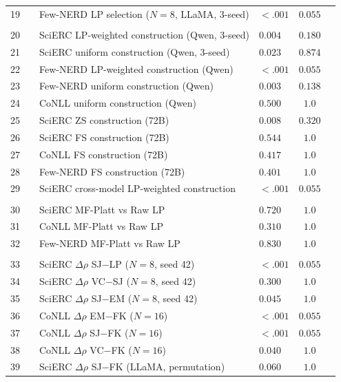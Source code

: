 \begin{table}[t]
\begin{tabular}{clllcc}
19 & & Few-NERD LP selection ($N{=}8$, LLaMA, 3-seed) & ${<}.001$ & $0.055$ &  \\
\addlinespace
\multicolumn{6}{l}{\textit{Construction}} \\
20 & & SciERC LP-weighted construction (Qwen, 3-seed) & $0.004$ & $0.180$ &  \\
21 & & SciERC uniform construction (Qwen, 3-seed) & $0.023$ & $0.874$ &  \\
22 & & Few-NERD LP-weighted construction (Qwen) & ${<}.001$ & $0.055$ &  \\
23 & & Few-NERD uniform construction (Qwen) & $0.003$ & $0.138$ &  \\
24 & & CoNLL uniform construction (Qwen) & $0.500$ & $1.0$ &  \\
25 & & SciERC ZS construction (72B) & $0.008$ & $0.320$ &  \\
26 & & SciERC FS construction (72B) & $0.544$ & $1.0$ &  \\
27 & & CoNLL FS construction (72B) & $0.417$ & $1.0$ &  \\
28 & & Few-NERD FS construction (72B) & $0.401$ & $1.0$ &  \\
29 & & SciERC cross-model LP-weighted construction & ${<}.001$ & $0.055$ &  \\
\addlinespace
\multicolumn{6}{l}{\textit{Calibration}} \\
30 & & SciERC MF-Platt vs Raw LP & $0.720$ & $1.0$ &  \\
31 & & CoNLL MF-Platt vs Raw LP & $0.310$ & $1.0$ &  \\
32 & & Few-NERD MF-Platt vs Raw LP & $0.830$ & $1.0$ &  \\
\addlinespace
\multicolumn{6}{l}{\textit{Signal $\Delta\rho$}} \\
33 & & SciERC $\Delta\rho$ SJ$-$LP ($N{=}8$, seed 42) & ${<}.001$ & $0.055$ &  \\
34 & & SciERC $\Delta\rho$ VC$-$SJ ($N{=}8$, seed 42) & $0.300$ & $1.0$ &  \\
35 & & SciERC $\Delta\rho$ SJ$-$EM ($N{=}8$, seed 42) & $0.045$ & $1.0$ &  \\
36 & & CoNLL $\Delta\rho$ EM$-$FK ($N{=}16$) & ${<}.001$ & $0.055$ &  \\
37 & & CoNLL $\Delta\rho$ SJ$-$FK ($N{=}16$) & ${<}.001$ & $0.055$ &  \\
38 & & CoNLL $\Delta\rho$ VC$-$FK ($N{=}16$) & $0.040$ & $1.0$ &  \\
39 & & SciERC $\Delta\rho$ SJ$-$FK (LLaMA, permutation) & $0.060$ & $1.0$ &  \\

\end{tabular}
\end{table}
